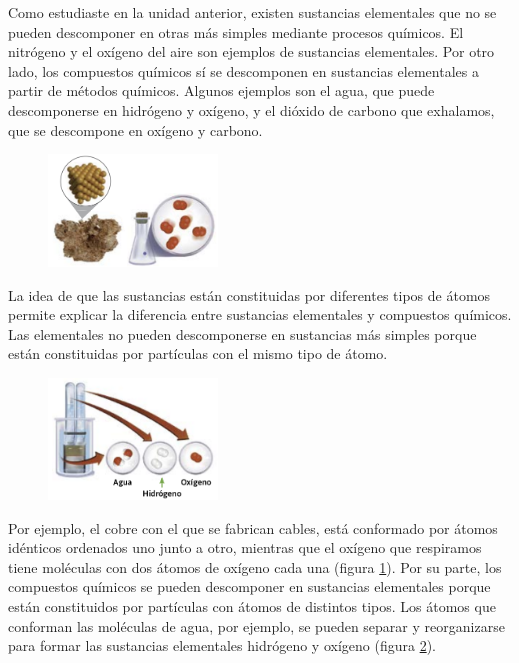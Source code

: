\documentclass[11pt]{book}
\begin{document}
Como estudiaste en la unidad anterior, existen sustancias elementales que no se pueden descomponer
en otras más simples mediante procesos químicos. El nitrógeno y el oxígeno del aire son
ejemplos de sustancias elementales. Por otro lado, los compuestos
químicos sí se descomponen en sustancias elementales a partir
de métodos químicos. Algunos ejemplos son el agua, que puede
descomponerse en hidrógeno y oxígeno, y el dióxido de carbono
que exhalamos, que se descompone en oxígeno y carbono.\\

\begin{figure}
  \centering
  \includegraphics[width=0.4\textwidth]{atomos03.png}
  \label{fig:atomos03}
\end{figure}

La idea de que las sustancias están constituidas por diferentes
tipos de átomos permite explicar la diferencia entre sustancias elementales y
compuestos químicos. Las elementales no pueden descomponerse en sustancias más simples porque están constituidas
por partículas con el mismo tipo de átomo.\\

\begin{figure}
  \centering
  \includegraphics[width=0.4\textwidth]{atomos04.png}
  \label{fig:atomos04}
\end{figure}

Por ejemplo, el cobre
con el que se fabrican cables, está conformado por átomos idénticos ordenados uno junto a otro,
mientras que el oxígeno que respiramos tiene moléculas con dos átomos de oxígeno cada una (figura
\ref{fig:atomos03}). Por su parte, los compuestos químicos se pueden descomponer en sustancias elementales
porque están constituidos por partículas
con átomos de distintos tipos. Los átomos que conforman las moléculas de agua, por ejemplo, se pueden separar
y reorganizarse para
formar las sustancias elementales hidrógeno y oxígeno (figura \ref{fig:atomos04}).\\
\end{document}
